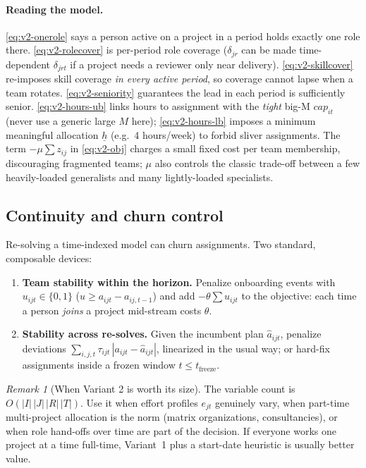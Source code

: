 \documentclass[11pt]{article}
\newcommand{\B}{\{0,1\}}
\theoremstyle{remark}
\newtheorem{remark}{Remark}[section]
\begin{document}
\paragraph{Reading the model.}
\eqref{eq:v2-onerole} says a person active on a project in a period holds
exactly one role there. \eqref{eq:v2-rolecover} is per-period role coverage
($\delta_{jr}$ can be made time-dependent $\delta_{jrt}$ if a project needs
a reviewer only near delivery). \eqref{eq:v2-skillcover} re-imposes skill
coverage \emph{in every active period}, so coverage cannot lapse when a
team rotates. \eqref{eq:v2-seniority} guarantees the lead in each period is
sufficiently senior. \eqref{eq:v2-hours-ub} links hours to assignment with
the \emph{tight} big-M $\mathit{cap}_{it}$ (never use a generic large $M$
here); \eqref{eq:v2-hours-lb} imposes a minimum meaningful allocation
$\underline{h}$ (e.g.\ 4 hours/week) to forbid sliver assignments.
The term $-\mu \sum z_{ij}$ in \eqref{eq:v2-obj} charges a small fixed cost
per team membership, discouraging fragmented teams; $\mu$ also controls
the classic trade-off between a few heavily-loaded generalists and many
lightly-loaded specialists.

\subsection{Continuity and churn control}
\label{sec:continuity}

Re-solving a time-indexed model can churn assignments. Two standard,
composable devices:
\begin{enumerate}[label=(\alph*)]
\item \textbf{Team stability within the horizon.} Penalize onboarding events with
  $u_{ijt} \in \B$ ($u \ge a_{ijt} - a_{ij,t-1}$) and add
  $-\theta \sum u_{ijt}$ to the objective: each time a person \emph{joins} a
  project mid-stream costs $\theta$.
\item \textbf{Stability across re-solves.} Given the incumbent plan
  $\hat{a}_{ijt}$, penalize deviations
  $\sum_{i,j,t} \tau_{ijt} \, | a_{ijt} - \hat{a}_{ijt} |$, linearized in the
  usual way; or hard-fix assignments inside a frozen window
  $t \le t_{\mathrm{freeze}}$.
\end{enumerate}

\begin{remark}[When Variant 2 is worth its size]
The variable count is $O(|I|\,|J|\,|R|\,|T|)$. Use it when effort profiles
$e_{jt}$ genuinely vary, when part-time multi-project allocation is the norm
(matrix organizations, consultancies), or when role hand-offs over time are
part of the decision. If everyone works one project at a time full-time,
Variant~1 plus a start-date heuristic is usually better value.
\end{remark}
\end{document}
